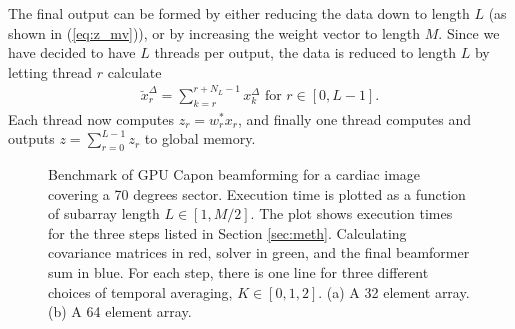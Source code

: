 \documentclass[conference]{IEEEtran}
\begin{document}
The final output can be formed by either reducing the data down to length $L$ (as shown in (\ref{eq:z_mv})), or by increasing the weight vector to length $M$. Since we have decided to have $L$ threads per output, the data is reduced to length $L$ by letting thread $r$ calculate 
\begin{align}
\breve{x}_{r}^{\Delta} = \sum_{k=r}^{r+N_L-1}x_{k}^{\Delta} \text{ for } r \in [0, L-1].
\end{align}
Each thread now computes $z_r = w_r^*x_r$, and finally one thread computes and outputs $z = \sum_{r=0}^{L-1} z_r$ to global memory.

\begin{figure}[!t]
\centerline{
\hfil
{}}
\caption{Benchmark of GPU Capon beamforming for a cardiac image covering a 70 degrees sector. Execution time is plotted as a function of subarray length $L \in [1, M/2]$. The plot shows execution times for the three steps listed in Section \ref{sec:meth}. Calculating covariance matrices in red, solver in green, and the final beamformer sum in blue. For each step, there is one line for three different choices of temporal averaging, $K \in [0, 1, 2]$. (a) A 32 element array. (b) A 64 element array.}
\label{fig:bench}
\end{figure}
\end{document}
